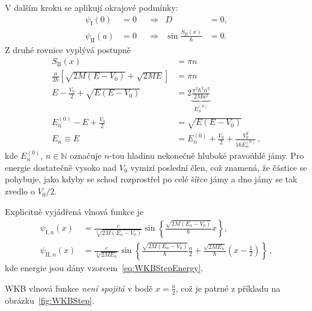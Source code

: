 \begin{solution}
	V dalším kroku se aplikují okrajové podmínky:
	\begin{subequations}
		\begin{align}
			\psi_{\mathrm{I}}(0)&=0 && \Longrightarrow & D&=0,\\
			\psi_{\mathrm{II}}(a)&=0 && \Longrightarrow & \sin{\frac{S_{\mathrm{II}}(x)}{\hbar}}&=0.
		\end{align}			
	\end{subequations}
	Z druhé rovnice vyplývá postupně
	\begin{align}
		S_{\mathrm{II}}(x)&=\pi n\nonumber\\
		\frac{a}{2\hbar}\left[\sqrt{2M(E-V_{0})}+\sqrt{2ME}\right]&=\pi n\nonumber\\
		E-\frac{V_{0}}{2}+\sqrt{E(E-V_{0})}&=2\underbrace{\frac{\pi^{2}\hbar^{2}n^{2}}{2Ma^{2}}}_{E_{n}^{(0)}}\nonumber\\
		E_{n}^{(0)}-E+\frac{V_{0}}{2}&=\sqrt{E(E-V_{0})}\nonumber\\
		E_{n}\equiv E&=E_{n}^{(0)}+\frac{V_{0}}{2}+\frac{V_{0}^{2}}{16E_{n}^{(0)}}\,,
		\label{eq:WKBStepEnergy}
	\end{align}
	kde $E_{n}^{(0)}$, $n\in\mathbb{N}$ označuje $n$-tou hladinu nekonečně hluboké pravoúhlé jámy.
	Pro energie dostatečně vysoko nad $V_{0}$ vymizí poslední člen, což znamená, že částice se pohybuje, jako kdyby se schod rozprostřel po celé šířce jámy a dno jámy se tak zvedlo o $V_{0}/2$.

	Explicitně vyjádřená vlnová funkce je
	\begin{subequations}
		\begin{align}
			\psi_{\mathrm{I},n}(x)&=\frac{c}{\sqrt[4]{2M\left(E_{n}-V_{0}\right)}}\sin{\left\{\frac{\sqrt{2M\left(E_{n}-V_{0}\right)}}{\hbar}x\right\}},\\
			\psi_{\mathrm{II},n}(x)&=\frac{c}{\sqrt[4]{2ME_{n}}}\sin{\left\{\frac{\sqrt{2M\left(E_{n}-V_{0}\right)}}{\hbar}\frac{a}{2}+\frac{\sqrt{2ME_{n}}}{\hbar}\left(x-\frac{1}{2}\right)\right\}}\,,
		\end{align}			
	\end{subequations}
	kde energie jsou dány vzorcem~\eqref{eq:WKBStepEnergy}.
	
	WKB vlnová funkce \emph{není spojitá} v bodě $x=\frac{a}{2}$, což je patrné z příkladu na obrázku~\ref{fig:WKBStep}.
\end{solution}
